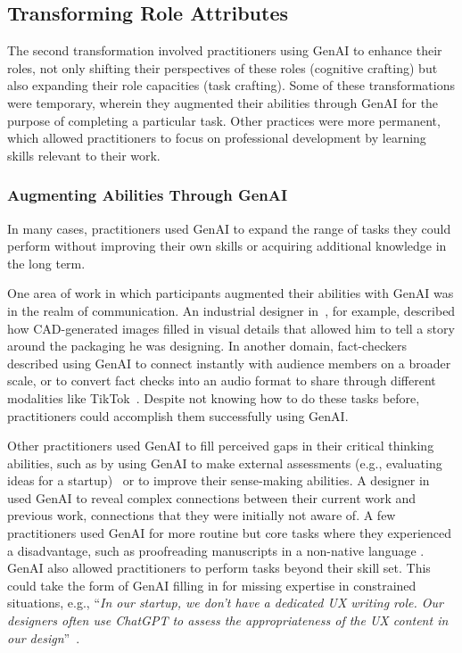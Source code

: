 
\subsection{Transforming Role Attributes} \label{sec:role}
The second transformation involved practitioners using GenAI to enhance their roles, not only shifting their perspectives of these roles (cognitive crafting) but also expanding their role capacities (task crafting). Some of these transformations were temporary, wherein they augmented their abilities through GenAI for the purpose of completing a particular task. Other practices were more permanent, which allowed practitioners to focus on professional development by learning skills relevant to their work. 

\subsubsection{Augmenting Abilities Through GenAI}
In many cases, practitioners used GenAI to expand the range of tasks they could perform without improving their own skills or acquiring additional knowledge in the long term. 

One area of work in which participants augmented their abilities with GenAI was in the realm of communication. An industrial designer in~\cite{18}, for example, described how CAD-generated images filled in visual details that allowed him to tell a story around the packaging he was designing. In another domain, fact-checkers described using GenAI to connect instantly with audience members on a broader scale, or to convert fact checks into an audio format to share through different modalities like TikTok~\cite{1}. Despite not knowing how to do these tasks before, practitioners could accomplish them successfully using GenAI. 

Other practitioners used GenAI to fill perceived gaps in their critical thinking abilities, such as by using GenAI to make external assessments (e.g., evaluating ideas for a startup)~\cite{21} or to improve their sense-making abilities. A designer in~\cite{18} used GenAI to reveal complex connections between their current work and previous work, connections that they were initially not aware of. A few practitioners used GenAI for more routine but core tasks where they experienced a disadvantage, such as proofreading manuscripts in a non-native language \cite{13}. GenAI also allowed practitioners to perform tasks beyond their skill set. 
This could take the form of GenAI filling in for missing expertise in constrained situations, e.g., ``\textit{In our startup, we don't have a dedicated UX writing role. Our designers often use ChatGPT to assess the appropriateness of the UX content in our design}''~\cite{2}.


